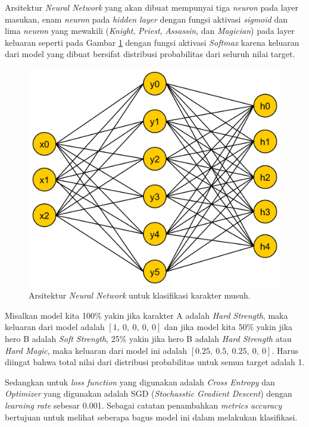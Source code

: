 Arsitektur \textit{Neural Network} yang akan dibuat mempunyai tiga \textit{neuron} pada layer masukan, enam \textit{neuron} pada \textit{hidden layer} dengan fungsi aktivasi \textit{sigmoid} dan lima \textit{neuron} yang mewakili (\textit{Knight}, \textit{Priest}, \textit{Assassin}, dan \textit{Magician}) pada layer keluaran seperti pada Gambar \ref{fig:nn_enemy} dengan fungsi aktivasi \textit{Softmax} karena keluaran dari model yang dibuat bersifat distribusi probabilitas dari seluruh nilai target.

\begin{figure} [!h] \centering
	\includegraphics[scale=0.08]{img/nn_enemy_character.png}
	\caption{Arsitektur \textit{Neural Network} untuk klasifikasi karakter musuh.}
	\label{fig:nn_enemy}
	\vspace{1ex}
\end{figure}

Misalkan model kita 100\% yakin jika karakter A adalah \textit{Hard Strength}, maka keluaran dari model adalah $\left[1,\ 0,\ 0,\ 0,\ 0 \right]$ dan jika model kita 50\% yakin jika hero B adalah \textit{Soft Strength}, 25\% yakin jika hero B adalah \textit{Hard Strength} atau \textit{Hard Magic}, maka keluaran dari model ini adalah $\left[0.25,\ 0.5,\ 0.25, \ 0, \ 0 \right]$. Harus diingat bahwa total nilai dari distribusi probabilitas untuk semua target adalah 1.
\vspace{1ex}

Sedangkan untuk \textit{loss function} yang digunakan adalah \textit{Cross Entropy} dan \textit{Optimizer} yang digunakan adalah SGD (\textit{Stochasstic Gradient Descent}) dengan \textit{learning rate} sebesar 0.001. Sebagai catatan penambahkan \textit{metrics accuracy} bertujuan untuk melihat seberapa bagus model ini dalam melakukan klasifikasi.
\vspace{1ex}

